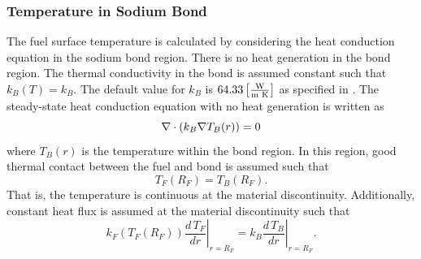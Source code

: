    \subsubsection{Temperature in Sodium Bond}
      The fuel surface temperature is calculated by considering the heat
      conduction equation in the sodium bond region. There is no heat generation
      in the bond region.  The thermal conductivity in the bond is assumed
      constant such that $k_B(T) = k_B$. The default value for $k_B$ is 
      $64.33 \left[\text{{$\frac{\text{W}}{\text{m K}}$}}\right]$ as specified in
      . The steady-state heat conduction equation with no
      heat generation is written as
      \begin{equation}
        \label{eq:tc_grad}
        \mathbf{\nabla} \cdot (k_B \mathbf{\nabla} T_B(r)) = 0
      \end{equation}
      where $T_B(r)$ is the temperature within the bond region.
      In this region, good thermal contact between the fuel and bond is
      assumed such that
      \begin{equation}
        \label{eq:rf_temp_continuity}
        T_F(R_F)=T_B(R_F).
      \end{equation}
      That is, the temperature is 
      continuous at the material discontinuity. Additionally, constant heat flux
      is assumed at the material discontinuity such that
      \begin{equation}
        \label{eq:rf_flux_continuity}
        k_F(T_F(R_F)) \left.\frac{d\,T_F}{dr}\right|_{r=R_F} = 
          k_B \left.\frac{d\,T_B}{dr}\right|_{r=R_F}.
      \end{equation}

